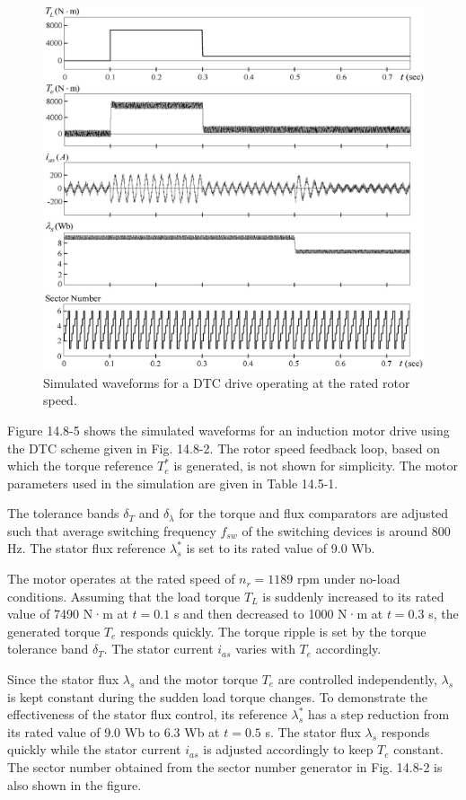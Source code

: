 \documentclass[letterpaper,12pt]{article}
\begin{document}
\begin{figure}[h]
\centering
\includegraphics{graficos/img27.jpg}
\caption{Simulated waveforms for a DTC drive operating at the rated rotor speed.}
\label{fig:14.8-5}
\end{figure}
\FloatBarrier

Figure 14.8-5 shows the simulated waveforms for an induction motor drive using the DTC scheme given in Fig. 14.8-2. The rotor speed feedback loop, based on which the torque reference $T_e^*$ is generated, is not shown for simplicity. The motor parameters used in the simulation are given in Table 14.5-1.

The tolerance bands $\delta_T$ and $\delta_\lambda$ for the torque and flux comparators are adjusted such that average switching frequency $f_{sw}$ of the switching devices is around 800 Hz. The stator flux reference $\lambda_s^*$ is set to its rated value of 9.0 Wb.

The motor operates at the rated speed of $n_r = 1189$ rpm under no-load conditions. Assuming that the load torque $T_L$ is suddenly increased to its rated value of 7490 N·m at $t = 0.1$ s and then decreased to 1000 N·m at $t = 0.3$ s, the generated torque $T_e$ responds quickly. The torque ripple is set by the torque tolerance band $\delta_T$. The stator current $i_{as}$ varies with $T_e$ accordingly.

Since the stator flux $\lambda_s$ and the motor torque $T_e$ are controlled independently, $\lambda_s$ is kept constant during the sudden load torque changes. To demonstrate the effectiveness of the stator flux control, its reference $\lambda_s^*$ has a step reduction from its rated value of 9.0 Wb to 6.3 Wb at $t = 0.5$ s. The stator flux $\lambda_s$ responds quickly while the stator current $i_{as}$ is adjusted accordingly to keep $T_e$ constant. The sector number obtained from the sector number generator in Fig. 14.8-2 is also shown in the figure.
\end{document}
